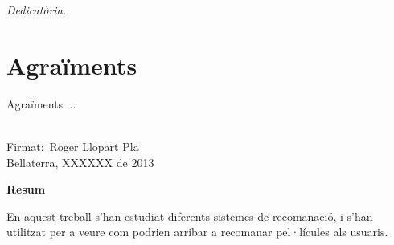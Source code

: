 \documentclass[a4paper,12pt,catalan]{book}
\begin{document}
\newpage 
\vspace*{1 cm} \vspace*{2in} 
\begin{flushright} 
\begin{minipage}{4in} 
\begin{flushright} {\em Dedicatòria.} 
\end{flushright} 
\end{minipage} 
\end{flushright} \rm


\chapter*{Agraïments}

Agraïments ...

\tableofcontents

\newpage
{}
\pagestyle{headings}


% 






\cleardoublepage
{}
{}
\printbibliography

\newpage 

\pagestyle{plain} 
\vspace*{6cm} 
\begin{center} 
\begin{minipage}{4in} 
\parindent=0pt \vspace*{1in} 
\begin{center} 
\vrule width 3in height 0.4pt
\\Firmat:\ Roger Llopart Pla
\\ Bellaterra, XXXXXX de 2013
\end{center} 
\end{minipage} 
\end{center} 

\newpage 

\thispagestyle{empty}

\vfill{}
{\par\centering \textbf{\large Resum}\large \par}

En aquest treball s'han estudiat diferents sistemes de recomanació, i s'han utilitzat per a veure com podrien arribar a recomanar pel·lícules als usuaris.
\end{document}
